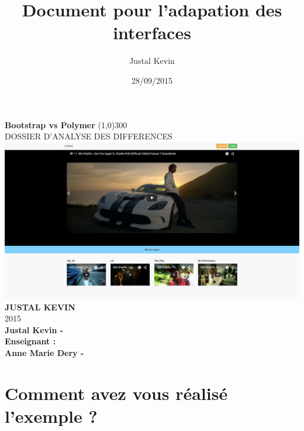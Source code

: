 \documentclass{article}
\title{Document pour l'adapation des interfaces}
\author{Justal Kevin}
\date{28/09/2015}
\begin{document}
\begin{center}
\textbf{\Huge{Bootstrap vs Polymer}}
\line(1,0){300}\\
DOSSIER D'ANALYSE DES DIFFERENCES\\
\vspace{3cm}
\includegraphics[width=1.0\textwidth]{pc}\\
\vspace{3cm}
\textbf{\Large{JUSTAL KEVIN}}\\
2015\\
\vspace{2cm}
\textbf{Justal Kevin -  \color{black}{- SI5 - IHM}}\\
\vspace{4cm}
\textbf{Enseignant :}\\
\textbf{Anne Marie Dery - }
\end{center}

\newpage
\newpage
\tableofcontents

\newpage

\section{Comment avez vous r\'ealis\'e l'exemple ?}
\end{document}
